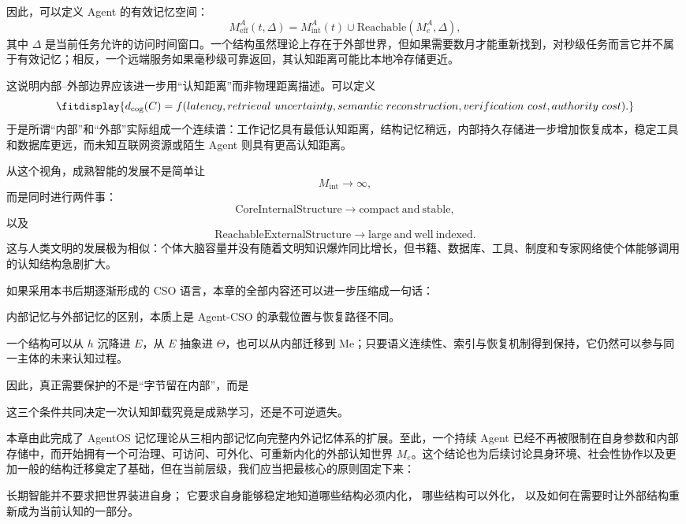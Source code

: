 因此，可以定义 Agent 的有效记忆空间：
\[
M_{\mathrm{eff}}^A(t,\Delta)
=
M_{\mathrm{int}}^A(t)
\cup
\mathrm{Reachable}
(
M_e^A,
\Delta
),
\]
其中 \(\Delta\) 是当前任务允许的访问时间窗口。一个结构虽然理论上存在于外部世界，但如果需要数月才能重新找到，对秒级任务而言它并不属于有效记忆；相反，一个远端服务如果毫秒级可靠返回，其认知距离可能比本地冷存储更近。

这说明内部--外部边界应该进一步用``认知距离''而非物理距离描述。可以定义
\[
\fitdisplay{
d_{\mathrm{cog}}(C)
=
f(
latency,
retrieval\ uncertainty,
semantic\ reconstruction,
verification\ cost,
authority\ cost
).
}
\]
于是所谓``内部''和``外部''实际组成一个连续谱：工作记忆具有最低认知距离，结构记忆稍远，内部持久存储进一步增加恢复成本，稳定工具和数据库更远，而未知互联网资源或陌生 Agent 则具有更高认知距离。

从这个视角，成熟智能的发展不是简单让
\[
M_{\mathrm{int}}\rightarrow\infty,
\]
而是同时进行两件事：
\[
\mathrm{CoreInternalStructure}\rightarrow
\mathrm{compact\ and\ stable},
\]
以及
\[
\mathrm{ReachableExternalStructure}
\rightarrow
\mathrm{large\ and\ well\ indexed}.
\]
这与人类文明的发展极为相似：个体大脑容量并没有随着文明知识爆炸同比增长，但书籍、数据库、工具、制度和专家网络使个体能够调用的认知结构急剧扩大。

如果采用本书后期逐渐形成的 CSO 语言，本章的全部内容还可以进一步压缩成一句话：
\begin{conclusion}
内部记忆与外部记忆的区别，本质上是 Agent-CSO 的承载位置与恢复路径不同。
\end{conclusion}
一个结构可以从 \(h\) 沉降进 \(E\)，从 \(E\) 抽象进 \(\Theta\)，也可以从内部迁移到 Me；只要语义连续性、索引与恢复机制得到保持，它仍然可以参与同一主体的未来认知过程。

因此，真正需要保护的不是``字节留在内部''，而是
\begin{statementbox}
\centering
{}
\end{statementbox}
这三个条件共同决定一次认知卸载究竟是成熟学习，还是不可逆遗失。

本章由此完成了 AgentOS 记忆理论从三相内部记忆向完整内外记忆体系的扩展。至此，一个持续 Agent 已经不再被限制在自身参数和内部存储中，而开始拥有一个可治理、可访问、可外化、可重新内化的外部认知世界 \(M_e\)。这个结论也为后续讨论具身环境、社会性协作以及更加一般的结构迁移奠定了基础，但在当前层级，我们应当把最核心的原则固定下来：

\begin{proposition*}
长期智能并不要求把世界装进自身；
它要求自身能够稳定地知道哪些结构必须内化，
哪些结构可以外化，
以及如何在需要时让外部结构重新成为当前认知的一部分。
\end{proposition*}

